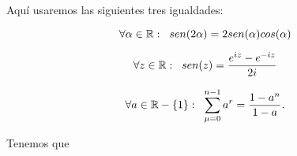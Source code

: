 Aquí usaremos las siguientes tres igualdades:

\begin{equation}
\label{eq10: 19Marzo}
\forall \alpha \in \mathbb{R}: \hspace{0.2cm}
sen(2 \alpha) = 2 sen(\alpha) cos(\alpha)
\end{equation}



\begin{equation}
\label{eq11: 19Marzo}
\forall z\in \mathbb{R}: \hspace{0.2cm}
sen(z)= \frac{e^{iz}-e^{-iz}}{2i}
\end{equation}



\begin{equation}
\label{eq12: 19Marzo}
\forall a \in \mathbb{R}-\{ 1 \}: \hspace{0.2cm}
\sum\limits_{\mu=0}^{n-1}a^{r}= \frac{1-a^{n}}{1-a}.
\end{equation}

\noindent
Tenemos que

